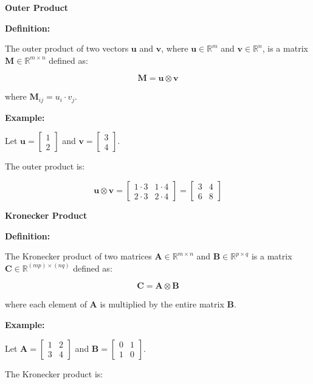 \documentclass[
  letterpaper,
  DIV=11,
  numbers=noendperiod]{scrreprt}
\theoremstyle{plain}
\theoremstyle{definition}
\theoremstyle{remark}
\begin{document}
\textbf{Outer Product}

\textbf{Definition:}

The outer product of two vectors \(\mathbf{u}\) and \(\mathbf{v}\),
where \(\mathbf{u} \in \mathbb{R}^m\) and
\(\mathbf{v} \in \mathbb{R}^n\), is a matrix
\(\mathbf{M} \in \mathbb{R}^{m \times n}\) defined as:

\[
\mathbf{M} = \mathbf{u} \otimes \mathbf{v}
\]

where \(\mathbf{M}_{ij} = u_i \cdot v_j\).

\textbf{Example:}

Let \(\mathbf{u} = \begin{bmatrix}1\\2\end{bmatrix}\) and
\(\mathbf{v} = \begin{bmatrix}3\\4\end{bmatrix}\).

The outer product is:

\[
\mathbf{u} \otimes \mathbf{v} = \begin{bmatrix}1 \cdot 3 & 1 \cdot 4 \\ 2 \cdot 3 & 2 \cdot 4\end{bmatrix} = \begin{bmatrix}3 & 4 \\ 6 & 8\end{bmatrix}
\]

\textbf{Kronecker Product}

\textbf{Definition:}

The Kronecker product of two matrices
\(\mathbf{A} \in \mathbb{R}^{m \times n}\) and
\(\mathbf{B} \in \mathbb{R}^{p \times q}\) is a matrix
\(\mathbf{C} \in \mathbb{R}^{(mp) \times (nq)}\) defined as:

\[
\mathbf{C} = \mathbf{A} \otimes \mathbf{B}
\]

where each element of \(\mathbf{A}\) is multiplied by the entire matrix
\(\mathbf{B}\).

\textbf{Example:}

Let \(\mathbf{A} = \begin{bmatrix}1&2\\3&4\end{bmatrix}\) and
\(\mathbf{B} = \begin{bmatrix}0&1\\1&0\end{bmatrix}\).

The Kronecker product is:
\end{document}
